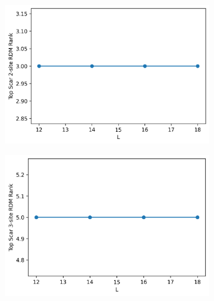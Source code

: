 \documentclass[11pt]{article}
\begin{document}
\begin{itemize}
\begin{itemize}
\begin{figure}[H]
    \centering
    \begin{subfigure}{0.45\textwidth}
        \includegraphics[width=\linewidth]{dw_scar_2p.png}
        \caption{}
        \label{fig:image1p}
    \end{subfigure}
    \begin{subfigure}{0.45\textwidth}
        \includegraphics[width=\linewidth]{dw_scar_3p.png}
        \caption{}
        \label{fig:image2p}
    \end{subfigure}    %
    \begin{subfigure}{0.45\textwidth}

\end{subfigure}
\end{figure}
\end{itemize}
\end{itemize}
\end{document}
